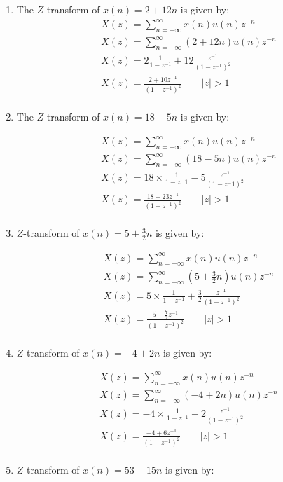 \documentclass[journal,12pt,twocolumn]{IEEEtran}
\theoremstyle{remark}
\begin{document}
\begin{enumerate}
 \item 
The $Z$-transform of $x(n) = 2 + 12n$ is given by:
\begin{align}
    &X(z)= \sum_{n=-\infty}^{\infty} x(n) u(n)z^{-n}\\
    &X(z) = \sum_{n=-\infty}^{\infty} (2+12n) u(n)z^{-n}\\
    &X(z)=2 \frac{1}{1-{z^{-1}}}+ 12\frac{z^{-1}}{(1-{z^{-1}})^2}\\
    &X(z)=\frac{2+{10z^{-1}}}{(1-{z^{-1}})^2}  \qquad|z|>1 \\
\end{align}
\item
The $Z$-transform of $x(n) = 18 - 5n$ is given by:

\begin{align}
    &X(z) = \sum_{n=-\infty}^{\infty} x(n) u(n)z^{-n}\\
    &X(z) = \sum_{n=-\infty}^{\infty} (18-5n) u(n)z^{-n}\\
    &X(z)=18 \times \frac{1}{1-{z^-1}} - 5\frac{z^{-1}}{(1-{z^-1})^2}\\
    &X(z)=\frac{18-{23z^{-1}}}{(1-{z^{-1}})^2} \qquad  |z|>1 \\
\end{align}
\item 
$Z$-transform of $x(n) = 5 + \frac{3}{2}n$ is given by:

\begin{align}
    &X(z) = \sum_{n=-\infty}^{\infty} x(n) u(n)z^{-n} \\
    &X(z) = \sum_{n=-\infty}^{\infty} (5+\frac{3}{2}n) u(n)z^{-n} \\
    &X(z)=5 \times \frac{1}{1-{z^{-1}}}+ \frac{3}{2}\frac{z^{-1}}{(1-{z^{-1}})^2}\\
    &X(z)=\frac{5-\frac{7}{2}{z^{-1}}}{(1-{z^{-1}})^2} \qquad |z|>1\\
\end{align}
\item 

\vspace{2cm}
$Z$-transform of $x(n) = -4 + 2n$ is given by:

\begin{align}
       &X(z) = \sum_{n=-\infty}^{\infty} x(n) u(n)z^{-n} \\
       &X(z) = \sum_{n=-\infty}^{\infty} (-4 + 2n) u(n)z^{-n} \\
       &X(z)=-4 \times \frac{1}{1-{z^{-1}}}+ 2 \frac{z^{-1}}{(1-{z^{-1}})^2}\\
       &X(z)=\frac{-4+6{z^{-1}}}{(1-{z^{-1}})^2} \qquad  |z|>1\\
\end{align}
\item 
$Z$-transform of $x(n) = 53 - 15n$ is given by:


\end{enumerate}
\end{document}
